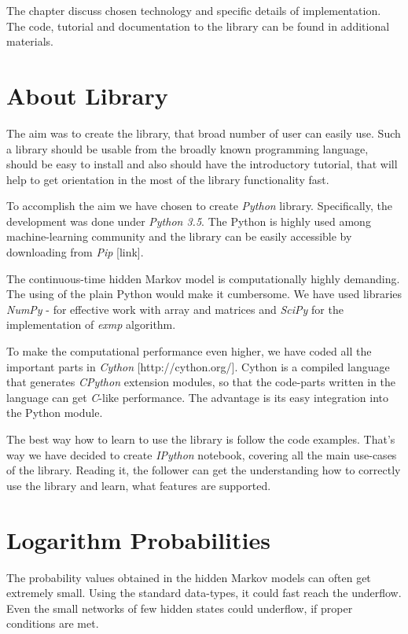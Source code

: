 \documentclass[thesis=M,english]{FITthesis}[2012/10/20]
\begin{document}
The chapter discuss chosen technology and specific details of implementation. 
The code, tutorial and documentation to the library can be found in additional materials.

\section{About Library}

The aim was to create the library, that broad number of user can easily use. Such a library should be usable from the broadly known programming language, should be easy to install and also should have the introductory tutorial, that will help to get orientation in the most of the library functionality fast. 

To accomplish the aim we have chosen to create \textit{Python} library. Specifically, the development was done under \textit{Python 3.5}. The Python is highly used among machine-learning community and the library can be easily accessible by downloading from \textit{Pip} [link]. 

The continuous-time hidden Markov model is computationally highly demanding. The using of the plain Python would make it cumbersome. We have used libraries \textit{NumPy} - for effective work with array and matrices and \textit{SciPy} for the implementation of \textit{exmp} algorithm. 

To make the computational performance even higher, we have coded all the important parts in \textit{Cython} [http://cython.org/]. Cython is a compiled language that generates \textit{CPython} extension modules, so that the code-parts written in the language can get \textit{C}-like performance. The advantage is its easy integration into the Python module.

The best way how to learn to use the library is follow the code examples. That's way we have decided to create \textit{IPython} notebook, covering all the main use-cases of the library. Reading it, the follower can get the understanding how to correctly use the library and learn, what features are supported.          


\section{Logarithm Probabilities}

The probability values obtained in the hidden Markov models can often get extremely small. Using the standard data-types, it could fast reach the underflow. Even the small networks of few hidden states could underflow, if proper conditions are met. 
\end{document}
